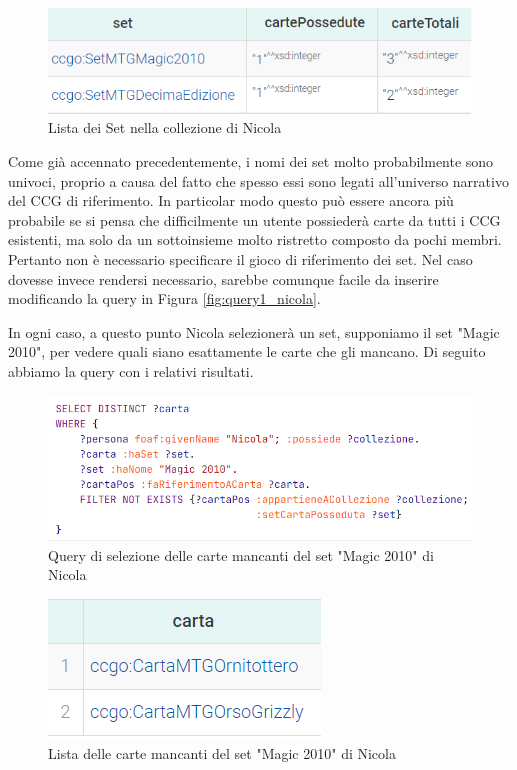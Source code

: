 \documentclass[12pt]{article}
\begin{document}
\begin{figure}[H]
    \centering
    \includegraphics[]{files/res1_nicola.png}
    \caption{Lista dei Set nella collezione di Nicola}
    \label{fig:res1_nicola}
\end{figure}

Come già accennato precedentemente, i nomi dei set molto probabilmente sono univoci, proprio a causa del fatto che spesso essi sono legati all'universo narrativo del CCG di riferimento. In particolar modo questo può essere ancora più probabile se si pensa che difficilmente un utente possiederà carte da tutti i CCG esistenti, ma solo da un sottoinsieme molto ristretto composto da pochi membri. Pertanto non è necessario specificare il gioco di riferimento dei set. Nel caso dovesse invece rendersi necessario, sarebbe comunque facile da inserire modificando la query in Figura \ref{fig:query1_nicola}.

In ogni caso, a questo punto Nicola selezionerà un set, supponiamo il set "Magic 2010", per vedere quali siano esattamente le carte che gli mancano. Di seguito abbiamo la query con i relativi risultati.


\begin{figure}[H]
    \centering
    \includegraphics[width=14cm]{files/query2_nicola.png}
    \caption{Query di selezione delle carte mancanti del set "Magic 2010" di Nicola}
    \label{fig:query2_nicola}
\end{figure}

\begin{figure}[H]
    \centering
    \includegraphics[]{files/res2_nicola.png}
    \caption{Lista delle carte mancanti del set "Magic 2010" di Nicola}
    \label{fig:res2_nicola}
\end{figure}
\end{document}
